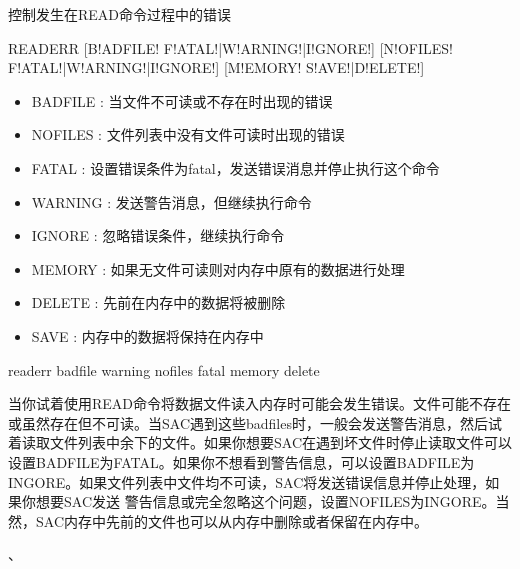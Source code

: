 \label{cmd:readerr}

控制发生在READ命令过程中的错误

\begin{SACSTX}
READERR [B!ADFILE! F!ATAL!|W!ARNING!|I!GNORE!] [N!OFILES! F!ATAL!|W!ARNING!|I!GNORE!] 
    [M!EMORY! S!AVE!|D!ELETE!]
\end{SACSTX}

\begin{itemize}
\item BADFILE : 当文件不可读或不存在时出现的错误 
\item NOFILES : 文件列表中没有文件可读时出现的错误 
\item FATAL : 设置错误条件为fatal，发送错误消息并停止执行这个命令 
\item WARNING : 发送警告消息，但继续执行命令 
\item IGNORE : 忽略错误条件，继续执行命令 
\item MEMORY : 如果无文件可读则对内存中原有的数据进行处理 
\item DELETE : 先前在内存中的数据将被删除 
\item SAVE : 内存中的数据将保持在内存中 
\end{itemize}

\begin{SACDFT}
readerr badfile warning nofiles fatal memory delete
\end{SACDFT}

当你试着使用READ命令将数据文件读入内存时可能会发生错误。文件可能不存在或虽然存在但不可读。当SAC遇到这些badfiles时，一般会发送警告消息，然后试着读取文件列表中余下的文件。如果你想要SAC在遇到坏文件时停止读取文件可以设置BADFILE为FATAL。如果你不想看到警告信息，可以设置BADFILE为INGORE。如果文件列表中文件均不可读，SAC将发送错误信息并停止处理，如果你想要SAC发送	警告信息或完全忽略这个问题，设置NOFILES为INGORE。当然，SAC内存中先前的文件也可以从内存中删除或者保留在内存中。

、
